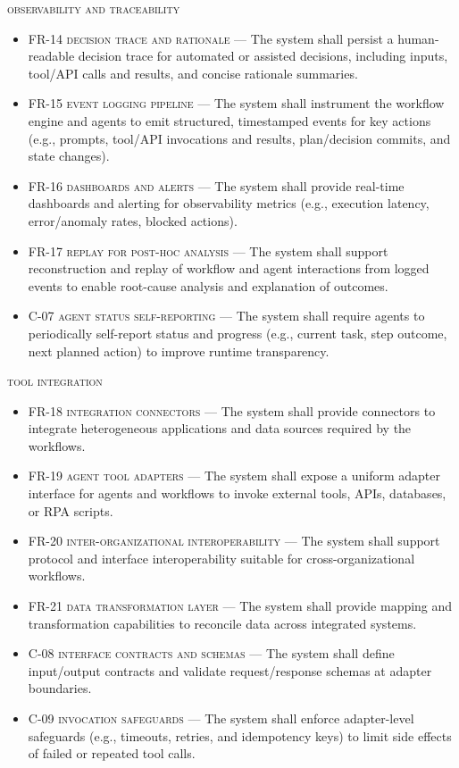 \begin{footnotesize}
    \textsc{observability and traceability}
      \begin{itemize}
        \item \textsc{FR-14 decision trace and rationale} --- The system shall persist a human-readable decision trace for automated or assisted decisions, including inputs, tool/API calls and results, and concise rationale summaries.
        \item \textsc{FR-15 event logging pipeline} --- The system shall instrument the workflow engine and agents to emit structured, timestamped events for key actions (e.g., prompts, tool/API invocations and results, plan/decision commits, and state changes).
        \item \textsc{FR-16 dashboards and alerts} --- The system shall provide real-time dashboards and alerting for observability metrics (e.g., execution latency, error/anomaly rates, blocked actions).
        \item \textsc{FR-17 replay for post-hoc analysis} --- The system shall support reconstruction and replay of workflow and agent interactions from logged events to enable root-cause analysis and explanation of outcomes.
        \item \textsc{C-07 agent status self-reporting} --- The system shall require agents to periodically self-report status and progress (e.g., current task, step outcome, next planned action) to improve runtime transparency.
      \end{itemize}
    \textsc{tool integration}
      \begin{itemize}
        \item \textsc{FR-18 integration connectors} --- The system shall provide connectors to integrate heterogeneous applications and data sources required by the workflows.
        \item \textsc{FR-19 agent tool adapters} --- The system shall expose a uniform adapter interface for agents and workflows to invoke external tools, APIs, databases, or RPA scripts.
        \item \textsc{FR-20 inter-organizational interoperability} --- The system shall support protocol and interface interoperability suitable for cross-organizational workflows.
        \item \textsc{FR-21 data transformation layer} --- The system shall provide mapping and transformation capabilities to reconcile data across integrated systems.
        \item \textsc{C-08 interface contracts and schemas} --- The system shall define input/output contracts and validate request/response schemas at adapter boundaries.
        \item \textsc{C-09 invocation safeguards} --- The system shall enforce adapter-level safeguards (e.g., timeouts, retries, and idempotency keys) to limit side effects of failed or repeated tool calls.
    \end{itemize}
\end{footnotesize}

